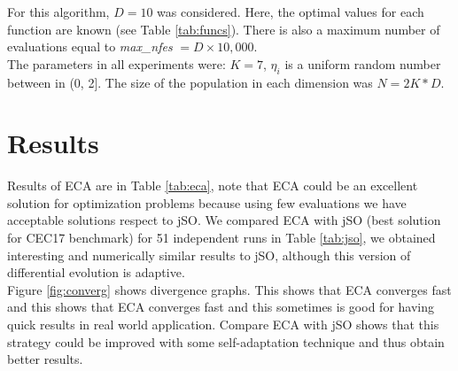 \documentclass[graybox]{svmult}
\begin{document}
For this algorithm, $D = 10$ was considered. Here, the optimal values for each 
function are known (see Table \ref{tab:funcs}). There is also a maximum number of 
evaluations equal to \textit{max\_nfes} $= D \times 10,000$.\\

The parameters in all experiments were: $K = 7$, $\eta_i$ is a uniform random number 
between in (0, 2]. The size of the population in each dimension was $N = 2K * D $.







\section{Results} %
\label{sec:results}

Results of ECA are in Table \ref{tab:eca}, note that ECA could be an excellent 
solution for optimization problems because using few evaluations we have acceptable 
solutions respect to jSO. We compared ECA with jSO (best solution for CEC17 benchmark) 
for 51 independent runs in Table \ref{tab:jso}, we obtained interesting and numerically 
similar results to jSO, although this version of differential evolution is adaptive.\\

Figure \ref{fig:converg} shows divergence graphs. This shows that ECA converges 
fast and this shows that ECA converges fast and this sometimes is good for having 
quick results in real world application. Compare ECA with jSO shows that this strategy 
could be improved with some  self-adaptation technique and thus obtain better results.
\end{document}
